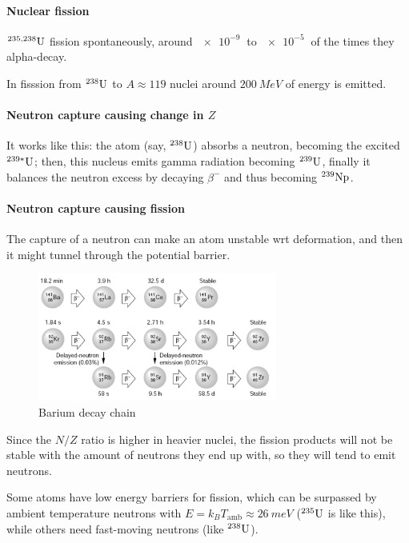 \documentclass{article}
\begin{document}
\paragraph{Nuclear fission}

\(^{235, 238}\ce{U} \) fission spontaneously, around \(\SI{e-9}{}\) to \(\SI{e-5}{} \) of the times they alpha-decay.

In fisssion from \(^{238} \ce{U} \) to \(A \approx 119\) nuclei around \(\SI{200}{MeV} \) of energy is emitted.

\paragraph{Neutron capture causing change in \(Z\)}

It works like this: the atom (say, \(^{238} \ce{U} \)) absorbs a neutron, becoming the excited \(^{239*} \ce{U} \); then, this nucleus emits gamma radiation becoming \(^{239} \ce{U} \), finally it balances the neutron excess by decaying \(\beta^-\) and thus becoming \(^{239} \ce{Np} \).

\paragraph{Neutron capture causing fission}

The capture of a neutron can make an atom unstable wrt deformation, and then it might tunnel through the potential barrier.

\begin{figure}
    \centering
    \includegraphics[width=0.7\textwidth]{../figures/barium_decay_chain.png}
    \caption{Barium decay chain}
    \label{fig:barium-decay}
\end{figure}

Since the \(N/Z\) ratio is higher in heavier nuclei, the fission products will not be stable with the amount of neutrons they end up with, so they will tend to emit neutrons.

Some atoms have low energy barriers for fission, which can be surpassed by ambient temperature neutrons with \(E = k_B T_ \text{amb} \approx \SI{26}{meV} \) (\(^{235} \ce{U} \) is like this), while others need fast-moving neutrons (like \(^{238} \ce{U} \)).
\end{document}
